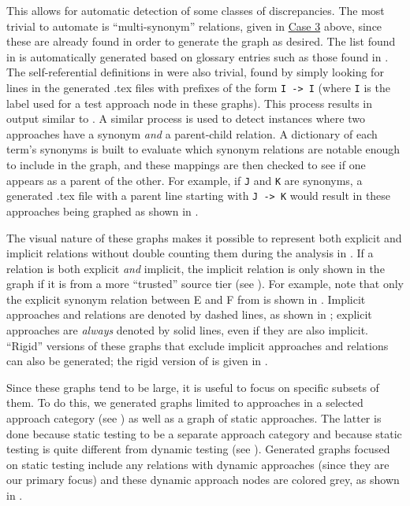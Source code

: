     This allows for automatic detection of some classes of discrepancies. The
    most trivial to automate is ``multi-synonym'' relations, given in
    \hyperref[case-three]{Case 3} above, since these are already found in order
    to generate the graph as desired. The list found in 
    is automatically generated based on glossary entries such as those found
    in . The self-referential definitions in
     were also trivial, found by simply looking for lines in
    the generated .tex files with prefixes of the form \texttt{I -> I} (where
    \texttt{I} is the label used for a test approach node in these graphs).
    This process results in output similar to . A
    similar process is used to detect instances where two approaches have a
    synonym \emph{and} a parent-child relation. A dictionary of each term's
    synonyms is built to evaluate which synonym relations are notable
    enough to include in the graph, and these mappings are then checked to
    see if one appears as a parent of the other. For example, if \texttt{J}
    and \texttt{K} are synonyms, a generated .tex file with a parent line
    starting with \texttt{J -> K} would result in these approaches being
    graphed as shown in .

    The visual nature of these graphs makes it possible to represent both
    explicit and implicit relations without double counting them during the
    analysis in . If a relation is both explicit
    \emph{and} implicit, the implicit relation is only shown in the graph
    if it is from a more ``trusted'' source tier (see ).
    For example, note that only the explicit synonym relation between E and F
    from  is shown in .
    Implicit approaches and relations are denoted by dashed lines, as shown
    in ; explicit approaches are
    \emph{always} denoted by solid lines, even if they are also implicit.
    ``Rigid'' versions of these graphs that exclude implicit approaches and
    relations can also be generated; the rigid version of
     is given in .

\fi
Since these graphs tend to be large, it is useful to focus on specific
subsets of them. \ifnotpaper To do this, we generated graphs limited to
    approaches in a selected approach category (see )
    as well as a graph of static approaches. The latter is done because
    \citet[Fig.~2]{IEEE2022}  static testing to be a
    separate approach category and because static testing is quite different
    from dynamic testing (see ). Generated graphs focused
    on static testing include any relations with dynamic approaches (since
    they are our primary focus) and these dynamic approach nodes are
    colored grey, as shown in .

